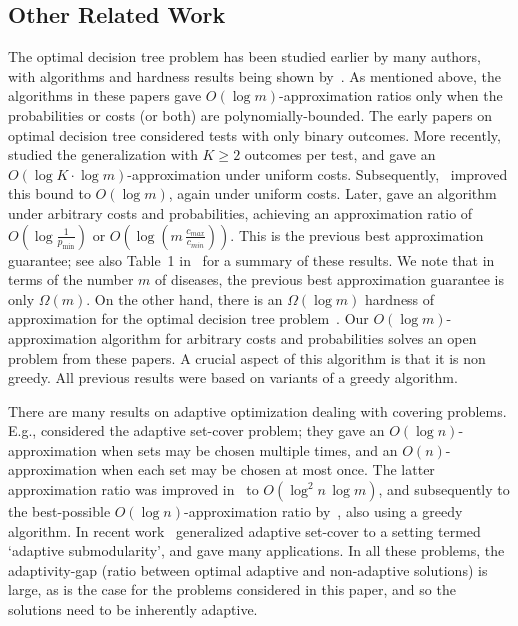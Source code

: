 \documentclass[11pt]{article}
\def\dtp{optimal decision tree problem\xspace}
\begin{document}
\subsection{Other Related Work}
The \dtp has been studied earlier by many authors, with algorithms and hardness results being shown
by~\cite{garey-graham,rivest-hyafil,loveland,kmb,AH12,dasgupta,CPRAM11,cprs09,gb09}. As mentioned above, the algorithms
in these papers gave $O(\log m)$-approximation ratios only when the probabilities or costs (or both) are
polynomially-bounded. The early papers on optimal decision tree considered tests with only binary outcomes.
More recently,~\cite{CPRAM11} studied the generalization with $K\ge 2$ outcomes per test, and gave an $O(\log
K\cdot \log m)$-approximation under uniform costs. Subsequently,~\cite{cprs09} improved this bound to $O(\log m)$,
again under uniform costs. Later, \cite{gb09} gave an algorithm under arbitrary costs and
probabilities, achieving an approximation ratio of $O\left(\log \frac1{p_{\min}}\right)$ or $O\left(\log
(m\,\frac{c_{max}}{c_{min}})\right)$. This is the previous best approximation guarantee; see also Table~1
in~\cite{gb09} for a summary of these results. We note that in terms of the number $m$ of diseases, the previous best approximation guarantee is only $\Omega(m)$. On the other hand, there is an $\Omega(\log m)$ hardness of approximation for the
\dtp~\cite{CPRAM11}. Our $O(\log m)$-approximation algorithm for arbitrary costs and probabilities solves an open problem from
these papers. A crucial aspect of this algorithm is that it is   non greedy. All previous results were based on
variants of a greedy algorithm.

There are many results on adaptive optimization dealing with covering problems. E.g., \cite{goemansv06} considered the adaptive set-cover problem; they
gave an $O(\log n)$-approximation when sets may be chosen multiple times, and an $O(n)$-approximation when each set may
be chosen at most once. The latter approximation ratio was improved in~\cite{msw07} to $O(\log^2 n\,\log m)$, and subsequently to the
best-possible $O(\log n)$-approximation ratio by~\cite{lpry08}, also using a greedy algorithm.  In recent
work~\cite{GK11} generalized adaptive set-cover to a setting termed `adaptive submodularity', and gave many
applications.  In all these problems, the adaptivity-gap  (ratio between optimal adaptive and non-adaptive solutions) is large, as is the case for the problems considered in this paper, and so the solutions
need to be inherently adaptive.
\end{document}
